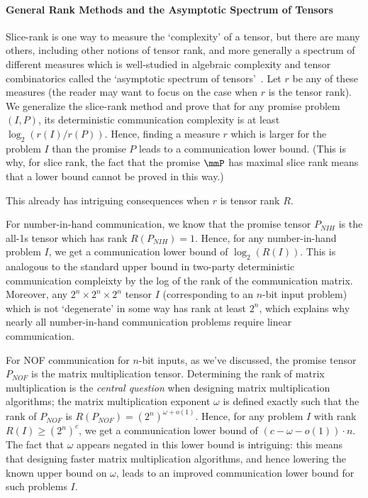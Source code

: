      \paragraph{General Rank Methods and the Asymptotic Spectrum of Tensors}

     Slice-rank is one way to measure the `complexity' of a tensor, but there are many others, including other notions of tensor rank, and more generally a spectrum of different measures which is well-studied in algebraic complexity and tensor combinatorics called the `asymptotic spectrum of tensors'~\cite{S86,WZ22}. Let $r$ be any of these measures (the reader may want to focus on the case when $r$ is the tensor rank). We generalize the slice-rank method and prove that for any promise problem $(I,P)$, its deterministic communication complexity is at least $\log_2(r(I) / r(P))$. Hence, finding a measure $r$ which is larger for the problem $I$ than the promise $P$ leads to a communication lower bound. (This is why, for slice rank, the fact that the promise $\mmP$ has maximal slice rank means that a lower bound cannot be proved in this way.)

     This already has intriguing consequences when $r$ is tensor rank $R$.
     
     For number-in-hand communication, we know that the promise tensor $P_{NIH}$ is the all-1s tensor which has rank $R(P_{NIH}) = 1$. Hence, for any number-in-hand problem $I$, we get a communication lower bound of $\log_2(R(I))$. This is analogous to the standard upper bound in two-party deterministic communication compleixty by the log of the rank of the communication matrix. Moreover, any $2^n \times 2^n \times 2^n$ tensor $I$ (corresponding to an $n$-bit input problem) which is not `degenerate' in some way has rank at least $2^n$, which explains why nearly all number-in-hand communication problems require linear communication. 

     For NOF communication for $n$-bit inputs, as we've discussed, the promise tensor $P_{NOF}$ is the matrix multiplication tensor. Determining the rank of matrix multiplication is the \emph{central question} when designing matrix multiplication algorithms; the matrix multiplication exponent $\omega$ is defined exactly such that the rank of $P_{NOF}$ is $R(P_{NOF}) = (2^n)^{\omega + o(1)}$. Hence, for any problem $I$ with rank $R(I) \geq (2^n)^c$, we get a communication lower bound of $(c - \omega - o(1)) \cdot n$. The fact that $\omega$ appears negated in this lower bound is intriguing: this means that designing faster matrix multiplication algorithms, and hence lowering the known upper bound on $\omega$, leads to an improved communication lower bound for such problems $I$. 

